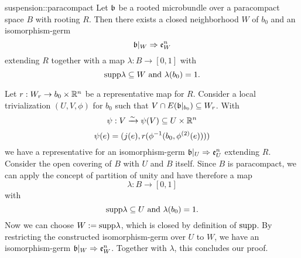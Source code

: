 \begin{mylemma}{suspension::paracompact}
    Let $\mathfrak{b}$ be a rooted microbundle over a paracompact space $B$ with rooting $R$.
    Then there exists a closed neighborhood $W$ of $b_0$ and an isomorphism-germ
    \[ \mathfrak{b}\vert_{W} \Rightarrow{} \mathfrak{e}^{n}_W \]
    extending $R$ together with a map $\lambda: B \to [0, 1]$ with
    \[ \text{supp}{\lambda} \subseteq{} W \text{ and } \lambda(b_0) = 1. \]
\end{mylemma}

\begin{myproof}
    Let $r: W_r \to b_0 \times \mathbb{R}^n$ be a representative map for $R$.
    Consider a local trivialization $(U, V, \phi)$ for $b_0$ such that $V \cap E(\mathfrak{b}\vert_{b_0}) \subseteq{} W_r$.
    With
    \[ \psi: V \xrightarrow{\sim} \psi(V) \subseteq{} U \times \mathbb{R}^n \]
    \[ \psi(e) = (j(e), r(\phi^{-1}(b_0, \phi^{(2)}(e)))) \]
    we have a representative for an isomorphism-germ $\mathfrak{b}\vert_{U} \Rightarrow{} \mathfrak{e}^{n}_U$ extending $R$.
    Consider the open covering of $B$ with $U$ and $B$ itself.
    Since $B$ is paracompact, we can apply the concept of partition of unity and have therefore a map
    \[ \lambda: B \to [0, 1] \]
    with 
    \[ \text{supp}\lambda \subseteq{} U \text{ and } \lambda(b_0) = 1. \]
    Now we can choose $W := \text{supp}\lambda$, which is closed by definition of $\text{supp}$.
    By restricting the constructed isomorphism-germ over $U$ to $W$, we have an isomorphism-germ $\mathfrak{b}\vert_{W} \Rightarrow{} \mathfrak{e}^{n}_W$.
    Together with $\lambda$, this concludes our proof.
\end{myproof}